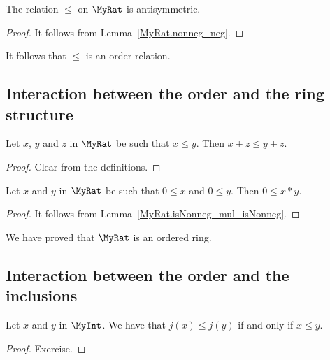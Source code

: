 \begin{lemma}
    \label{MyRat.le_antisymm}
    \leanok
    The relation $\leq$ on $\MyRat$ is antisymmetric.
\end{lemma}
\begin{proof}
    \leanok
    It follows from Lemma~\ref{MyRat.nonneg_neg}.
\end{proof}

It follows that $\leq$ is an order relation.


\subsection{Interaction between the order and the ring structure}

\begin{lemma}
    \label{MyRat.add_le_add_left}
    \leanok
    Let $x$, $y$ and $z$ in $\MyRat$ be such that $x \leq y$. Then $x + z \leq y + z$.
\end{lemma}
\begin{proof}
    \leanok
    Clear from the definitions.
\end{proof}

\begin{lemma}
    \label{MyRat.mul_nonneg}
    \leanok
    Let $x$ and $y$ in $\MyRat$ be such that $0 \leq x$ and $0 \leq y$. Then $0 \leq x * y$.
\end{lemma}
\begin{proof}
    \leanok
    It follows from Lemma~\ref{MyRat.isNonneg_mul_isNonneg}.
\end{proof}

We have proved that $\MyRat$ is an ordered ring.

\subsection{Interaction between the order and the inclusions}

\begin{lemma}
    \label{MyRat.j_le_iff}
    \leanok
    Let $x$ and $y$ in $\MyInt$. We have that $j(x) \leq j(y)$ if and only if $x \leq y$.
\end{lemma}
\begin{proof}
    \leanok
    Exercise.
\end{proof}

